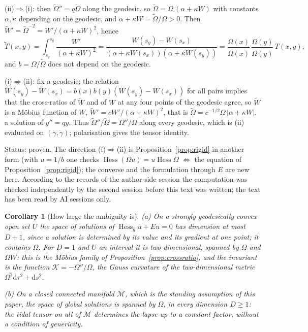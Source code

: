 \documentclass[11pt,a4paper]{article}
\makeatletter
\theoremstyle{stmt}
\newtheorem{corollary}[theorem]{Corollary}
\theoremstyle{defn}
\theoremstyle{rmk}
\renewenvironment{proof}[1][\proofname]{\par\pushQED{\qed}\normalfont\topsep6\p@\@plus6\p@\relax
  \trivlist\item[\hskip\labelsep{\sffamily\itshape\small #1.}]\ignorespaces}{\popQED\endtrivlist\@endpefalse}
\numberwithin{equation}{section}
\newcommand{\status}[1]{\par\noindent\textsf{\small Status: #1}\par}
\newcommand{\M}{\mathcal{M}}
\newcommand{\dd}{\mathrm{d}}
\makeatother
\begin{document}
{\begin{proof}
(ii)$\Rightarrow$(i): then $\tilde\Omega''=q\tilde\Omega$ along the geodesic, so $\tilde\Omega=\Omega\,(\alpha+\kappa W)$ with constants $\alpha,\kappa$ depending on the geodesic, and $\alpha+\kappa W=\tilde\Omega/\Omega>0$. Then $\tilde W'=\tilde\Omega^{-2}=W'/(\alpha+\kappa W)^2$, hence
\[
\tilde T(x,y)=\int_{s_x}^{s_y}\frac{W'}{(\alpha+\kappa W)^2}=\frac{W(s_y)-W(s_x)}{(\alpha+\kappa W(s_x))(\alpha+\kappa W(s_y))}=\frac{\Omega(x)}{\tilde\Omega(x)}\,\frac{\Omega(y)}{\tilde\Omega(y)}\,T(x,y),
\]
and $b=\Omega/\tilde\Omega$ does not depend on the geodesic.

(i)$\Rightarrow$(ii): fix a geodesic; the relation $\tilde W(s_y)-\tilde W(s_x)=b(x)b(y)(W(s_y)-W(s_x))$ for all pairs implies that the cross-ratios of $\tilde W$ and of $W$ at any four points of the geodesic agree, so $\tilde W$ is a M\"obius function of $W$, $\tilde W'=cW'/(\alpha+\kappa W)^2$, that is $\tilde\Omega=c^{-1/2}\Omega\,|\alpha+\kappa W|$, a solution of $y''=qy$. Thus $\tilde\Omega''/\tilde\Omega=\Omega''/\Omega$ along every geodesic, which is (ii) evaluated on $(\dot\gamma,\dot\gamma)$; polarisation gives the tensor identity.
\end{proof}
\status{proven. The direction (i)$\Rightarrow$(ii) is Proposition~\ref{prop:rigid} in another form (with $u=1/b$ one checks $\operatorname{Hess}(\Omega u)=u\operatorname{Hess}\Omega$ $\Leftrightarrow$ the equation of Proposition~\ref{prop:rigid}); the converse and the formulation through $E$ are new here. According to the records of the author-side session the computation was checked independently by the second session before this text was written; the text has been read by AI sessions only.}

\begin{corollary}[How large the ambiguity is]\label{cor:ambiguity}
\textup{(a)} On a strongly geodesically convex open set $U$ the space of solutions of $\operatorname{Hess}_{\hat g}u+Eu=0$ has dimension at most $D+1$, since a solution is determined by its value and its gradient at one point; it contains $\Omega$. For $D=1$ and $U$ an interval it is two-dimensional, spanned by $\Omega$ and $\Omega W$: this is the M\"obius family of Proposition~\ref{prop:crossratio}, and the invariant is the function $\mathcal K=-\Omega''/\Omega$, the Gauss curvature of the two-dimensional metric $\Omega^2\dd\tau^2+\dd s^2$.

\textup{(b)} On a closed connected manifold $\M$, which is the standing assumption of this paper, the space of global solutions is spanned by $\Omega$, in every dimension $D\ge1$: the tidal tensor on all of $\M$ determines the lapse up to a constant factor, without a condition of genericity.
\end{corollary}

}
\end{document}
